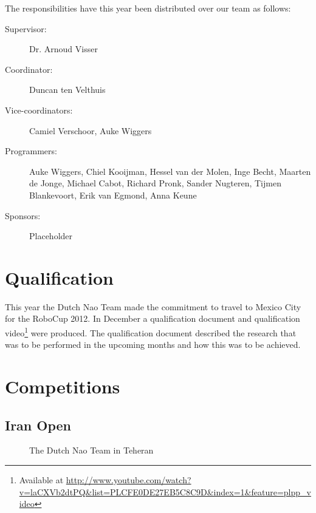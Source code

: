 \documentclass[11pt,a4paper,oneside]{article}
\begin{document}
The responsibilities have this year been distributed over our team as follows:
\begin{description}
\item[Supervisor:] Dr. Arnoud Visser %
\item[Coordinator:] Duncan ten Velthuis
\item[Vice-coordinators:] Camiel Verschoor, Auke Wiggers
\item[Programmers:] Auke Wiggers, Chiel Kooijman, Hessel van der Molen, Inge
    Becht, Maarten de Jonge, Michael Cabot, Richard Pronk, Sander Nugteren,
    Tijmen Blankevoort, Erik van Egmond, Anna Keune
\item[Sponsors:] Placeholder
\end{description}

\section{Qualification}
This year the Dutch Nao Team made the commitment to travel to Mexico City for the RoboCup 2012. In December a qualification document \cite{DutchNaoTeamQualification} and qualification video\footnote{Available at \url{http://www.youtube.com/watch?v=laCXVb2dtPQ&list=PLCFE0DE27EB5C8C9D&index=1&feature=plpp_video}} were produced. The qualification document described the research that was to be performed in the upcoming months and how this was to be achieved.

\section{Competitions}

\subsection{Iran Open}
\begin{figure}[htb]    	
\centering
{}
\caption{The Dutch Nao Team in Teheran}
\label{fig:TeamPhotoTeheran}
\end{figure}
\end{document}
